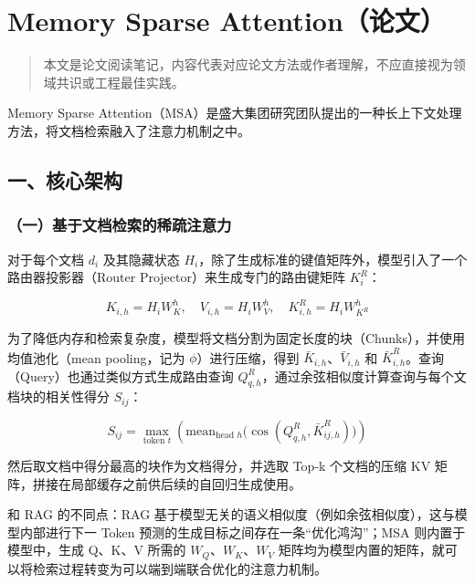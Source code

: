 \clearpage

\hypertarget{memory-sparse-attentionux8bbaux6587}{%
\section{Memory Sparse Attention（论文）}\label{memory-sparse-attentionux8bbaux6587}}

\begin{quote}
本文是论文阅读笔记，内容代表对应论文方法或作者理解，不应直接视为领域共识或工程最佳实践。
\end{quote}

Memory Sparse Attention（MSA）是盛大集团研究团队提出的一种长上下文处理方法，将文档检索融入了注意力机制之中。

\hypertarget{ux4e00ux6838ux5fc3ux67b6ux6784-5}{%
\subsection{一、核心架构}\label{ux4e00ux6838ux5fc3ux67b6ux6784-5}}

\hypertarget{ux4e00ux57faux4e8eux6587ux6863ux68c0ux7d22ux7684ux7a00ux758fux6ce8ux610fux529b}{%
\subsubsection{（一）基于文档检索的稀疏注意力}\label{ux4e00ux57faux4e8eux6587ux6863ux68c0ux7d22ux7684ux7a00ux758fux6ce8ux610fux529b}}

对于每个文档 \(d_i\) 及其隐藏状态 \(H_i\)，除了生成标准的键值矩阵外，模型引入了一个路由器投影器（Router Projector）来生成专门的路由键矩阵 \(K_i^{R}\)：

\[
K_{i,h}=H_iW_K^h,\quad V_{i,h}=H_iW_V^h,\quad K_{i,h}^{R}=H_iW_{K^R}^h
\]

为了降低内存和检索复杂度，模型将文档分割为固定长度的块（Chunks），并使用均值池化（mean pooling，记为 \(\phi\)）进行压缩，得到 \(\bar{K}_{i,h}\)、\(\bar{V}_{i,h}\) 和 \(\bar{K}_{i,h}^{R}\)。查询（Query）也通过类似方式生成路由查询 \(Q_{q,h}^{R}\)，通过余弦相似度计算查询与每个文档块的相关性得分 \(S_{ij}\)：

\[
S_{ij}=\max_{\text{token }t}\left(\mathrm{mean}_{\text{head }h}\big(\cos(Q_{q,h}^{R},\bar{K}_{ij,h}^{R})\big)\right)
\]

然后取文档中得分最高的块作为文档得分，并选取 Top-k 个文档的压缩 KV 矩阵，拼接在局部缓存之前供后续的自回归生成使用。

和 RAG 的不同点：RAG 基于模型无关的语义相似度（例如余弦相似度），这与模型内部进行下一 Token 预测的生成目标之间存在一条``优化鸿沟''；MSA 则内置于模型中，生成 Q、K、V 所需的 \(W_Q\)、\(W_K\)、\(W_V\) 矩阵均为模型内置的矩阵，就可以将检索过程转变为可以端到端联合优化的注意力机制。

